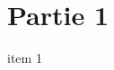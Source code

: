 \documentclass[11pt]{article}
\begin{document}
\section{Partie 1}

\begin{exercice}[1][Consigne]
  \begin{enu}
    \item item 1
  \end{enu}
\end{exercice}
\end{document}
